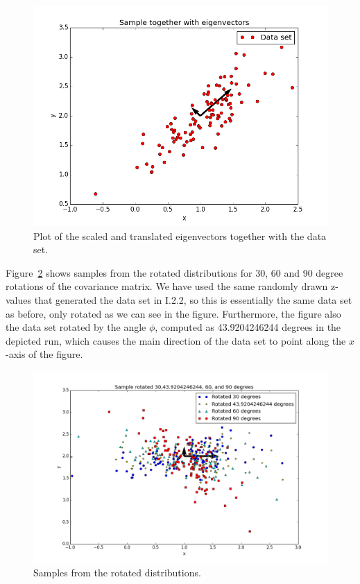 \documentclass[a4paper]{article}
\begin{document}
\begin{figure}[H]
  \centering
  \includegraphics[width=.6\linewidth]{figures/samples_with_eigenvectors.png}
  \caption{Plot of the scaled and translated eigenvectors together with the data set.}
  \label{fig:samples_with_eigenvectors}
\end{figure}

Figure~\ref{fig:samples_rotated} shows samples from the rotated distributions for 30, 60 and 90 degree rotations of the covariance matrix. We have used the same randomly drawn z-values that generated the data set in I.2.2, so this is essentially the same data set as before, only rotated as we can see in the figure. Furthermore, the figure also the data set rotated by the angle $\phi$, computed as 43.9204246244 degrees in the depicted run, which causes the main direction of the data set to point along the $x$-axis of the figure. 


\begin{figure}[H]
  \centering
  \includegraphics[width=1\linewidth]{figures/samples_rotated.png}
  \caption{Samples from the rotated distributions.}
  \label{fig:samples_rotated}
\end{figure}
\end{document}

